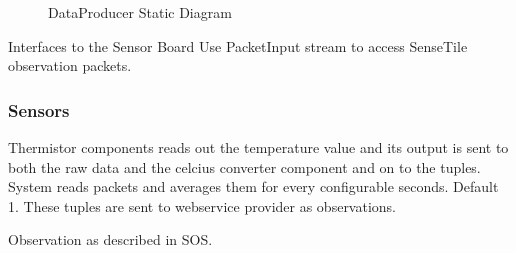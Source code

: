 \documentclass[]{final_report}
\begin{document}
\begin{figure}[H]
\caption{DataProducer Static Diagram}\label{fig:sensetile_static_diagam.png}
\end{figure}

Interfaces to the Sensor Board
Use PacketInput stream to access SenseTile observation packets.

\subsubsection{Sensors}

Thermistor components reads out the temperature value
and its output is sent to both the raw data and the celcius
converter component and on to the tuples. System reads packets
and averages them for every configurable seconds. Default 1.
These tuples are sent to webservice provider as observations.

Observation as described in SOS.
\end{document}
